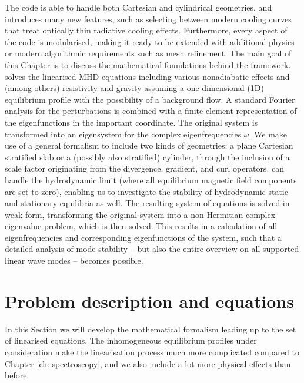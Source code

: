 The {\legolas} code is able to handle both Cartesian and cylindrical geometries, and introduces many new features, such as selecting between modern cooling curves that treat optically thin radiative cooling effects. Furthermore, every aspect of the code is modularised, making it ready to be extended with additional physics or modern algorithmic requirements such as mesh refinement. The main goal of this Chapter is to discuss the mathematical foundations behind the {\legolas} framework. {\legolas} solves the linearised MHD equations including various nonadiabatic effects and (among others) resistivity and gravity assuming a one-dimensional (\gls{1D}) equilibrium profile with the possibility of a background flow. A standard Fourier analysis for the perturbations is combined with a finite element representation of the eigenfunctions in the important coordinate. The original system is transformed into an eigensystem for the complex eigenfrequencies $\omega$. We make use of a general formalism to include two kinds of geometries: a plane Cartesian stratified slab or a (possibly also stratified) cylinder, through the inclusion of a scale factor originating from the divergence, gradient, and curl operators. {\legolas} can handle the hydrodynamic limit (where all equilibrium magnetic field components are set to zero), enabling us to investigate the stability of hydrodynamic static and stationary equilibria as well. The resulting system of equations is solved in weak form, transforming the original system into a non-Hermitian complex eigenvalue problem, which is then solved. This results in a calculation of all eigenfrequencies and corresponding eigenfunctions of the system, such that a detailed analysis of mode stability -- but also the entire overview on all supported linear wave modes -- becomes possible.


\section{Problem description and equations} \label{sec: problem description}
In this Section we will develop the mathematical formalism leading up to the set of linearised equations. The inhomogeneous equilibrium profiles under consideration make the linearisation process much more complicated compared to Chapter \ref{ch: spectroscopy}, and we also include a lot more physical effects than before.

